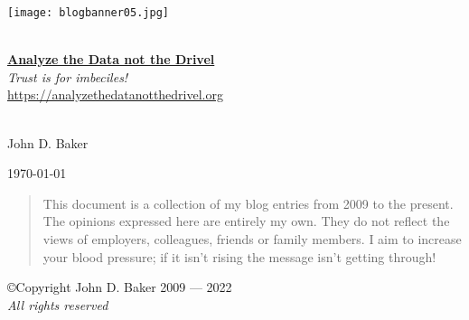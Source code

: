 %

\begin{titlepage}
 
\begin{center}

\texttt{[image: blogbanner05.jpg]}
 
\HRule \\[0.8cm]

{\Huge \href{https://analyzethedatanotthedrivel.org}{\textbf{Analyze the Data not the Drivel}}}\\[0.4cm]

\textsl{Trust is for imbeciles!}\\[0.4cm]

\url{https://analyzethedatanotthedrivel.org}\\[0.4cm]
 
\HRule \\[0.8cm]
 
 
\begin{minipage}{0.45\textwidth}
\begin{flushleft}
{\large John D. Baker} \\
\end{flushleft}
\end{minipage}
\begin{minipage}{0.45\textwidth}
\begin{flushright}
{\large \today} \\
\end{flushright}
\end{minipage}

\vspace{2cm}

\begin{quotation}
This document is a collection of my blog entries from 2009 to the present. The
opinions expressed here are entirely my own.
They do not reflect the views of employers, colleagues, friends or family members.
I aim to increase your blood pressure; if it isn't
rising the message isn't getting through!
\end{quotation}

\vfill

\copyright Copyright John D. Baker 2009 --- 2022 \\
\emph{All rights reserved} \\

 
\end{center}


 
\end{titlepage}

%
